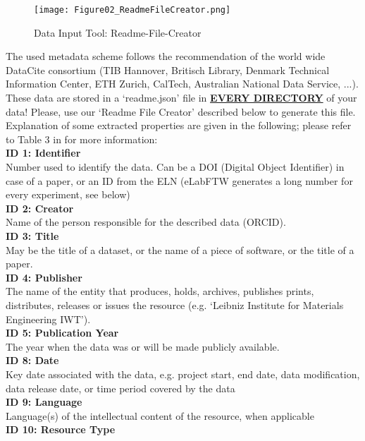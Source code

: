 \begin{wrapfigure}{r}{0.5\linewidth}
  \vspace{-1em}
  \texttt{[image: Figure02\_ReadmeFileCreator.png]}
  \caption{Data Input Tool: Readme-File-Creator}
  \label{fig:readme-creator}
\end{wrapfigure}
The used metadata scheme follows the recommendation of the world wide DataCite
consortium (TIB Hannover, Britisch Library, Denmark Technical Information
Center, ETH Zurich, CalTech, Australian National Data Service, ...). These data
are stored in a `readme.json' file in \textbf{\underline{EVERY DIRECTORY}} of
your data! Please, use our `Readme File Creator' described below to generate
this file.\\
Explanation of some extracted properties are given in the following; please
refer to Table 3 in \cite{datacite2019} for more information: \\[6pt]
%
\textbf{ID 1: Identifier} \\
Number used to identify the data. Can be a DOI (Digital Object Identifier) in
case of a paper, or an ID from the ELN (eLabFTW generates a long number for
every experiment, see below) \\[6pt]
%
\textbf{ID 2: Creator} \\
Name of the person responsible for the described data (ORCID). \\[6pt]
%
\textbf{ID 3: Title} \\
May be the title of a dataset, or the name of a piece of software, or the
title of a paper. \\[6pt]
%
\textbf{ID 4: Publisher} \\
The name of the entity that produces, holds, archives, publishes prints,
distributes, releases or issues the resource (e.g. `Leibniz Institute for
Materials Engineering IWT'). \\[6pt]
%
\textbf{ID 5: Publication Year} \\
The year when the data was or will be made publicly available. \\[6pt]
%
\textbf{ID 8: Date} \\
Key date associated with the data, e.g. project start, end date, data
modification, data release date, or time period covered by the data \\[6pt]
%
\textbf{ID 9: Language} \\
Language(s) of the intellectual content of the resource, when applicable \\[6pt]
%
\textbf{ID 10: Resource Type} \\
